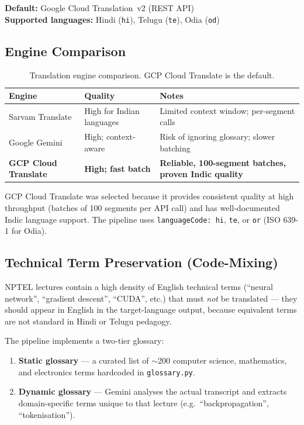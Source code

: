 \documentclass[12pt,a4paper]{article}
\begin{document}
\textbf{Default:} Google Cloud Translation~v2 (REST API)\\
\textbf{Supported languages:} Hindi (\texttt{hi}), Telugu (\texttt{te}), Odia (\texttt{od})

\subsection{Engine Comparison}

\begin{table}[H]
\centering
\begin{tabularx}{\linewidth}{lXX}
\toprule
\textbf{Engine} & \textbf{Quality} & \textbf{Notes} \\
\midrule
Sarvam Translate  & High for Indian languages        & Limited context window; per-segment calls \\
Google Gemini     & High; context-aware              & Risk of ignoring glossary; slower batching \\
\textbf{GCP Cloud Translate} & \textbf{High; fast batch} & \textbf{Reliable, 100-segment batches, proven Indic quality} \\
\bottomrule
\end{tabularx}
\caption{Translation engine comparison.  GCP Cloud Translate is the default.}
\end{table}

GCP Cloud Translate was selected because it provides consistent quality at
high throughput (batches of 100 segments per API call) and has well-documented
Indic language support.  The pipeline uses \texttt{languageCode: hi}, \texttt{te},
or \texttt{or} (ISO 639-1 for Odia).

\subsection{Technical Term Preservation (Code-Mixing)}

NPTEL lectures contain a high density of English technical terms
(``neural network'', ``gradient descent'', ``CUDA'', etc.) that must
\emph{not} be translated — they should appear in English in the target-language
output, because equivalent terms are not standard in Hindi or Telugu pedagogy.

The pipeline implements a two-tier glossary:

\begin{enumerate}
  \item \textbf{Static glossary} — a curated list of $\sim$200 computer science,
        mathematics, and electronics terms hardcoded in \texttt{glossary.py}.
  \item \textbf{Dynamic glossary} — Gemini analyses the actual transcript and
        extracts domain-specific terms unique to that lecture (e.g.\
        ``backpropagation'', ``tokenisation'').
\end{enumerate}
\end{document}
